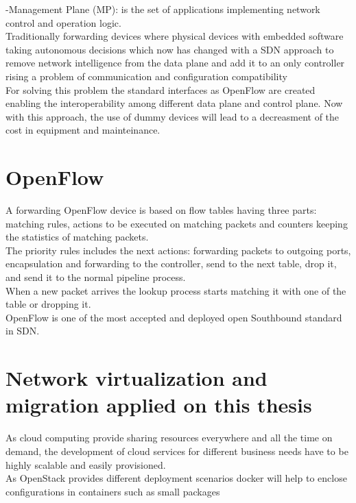 -Management Plane (MP): is the set of applications implementing network control and operation logic.\\

Traditionally forwarding devices where physical devices with embedded software taking autonomous decisions which now has changed with a SDN approach to remove network intelligence from the data plane and add it to an only controller rising a problem of communication and configuration compatibility\\

For solving this problem the standard interfaces as OpenFlow are created enabling the interoperability among different data plane and control plane. Now with this approach, the use of dummy devices will lead to a decreasment of  the cost in equipment and mainteinance.\\
 
\section{OpenFlow}
 
A forwarding OpenFlow device is based on flow tables having three parts: matching rules, actions to be executed on matching packets and counters keeping the statistics of matching packets.\\
 
The priority rules includes the next actions: forwarding packets to outgoing ports, encapsulation and forwarding to the controller, send to the next table, drop it, and send it to the normal pipeline process.\\
When a new packet arrives the lookup process starts matching it with one of the table or dropping it.\\

OpenFlow is one of the most accepted and deployed open Southbound standard in SDN.\\

\section{Network virtualization and migration applied on this thesis}

As cloud computing provide sharing resources everywhere and all the time on demand, the development of cloud services for different business needs have to be highly scalable and easily provisioned. \\

As OpenStack provides different deployment scenarios docker will help to enclose configurations in containers such as small packages\\ 

